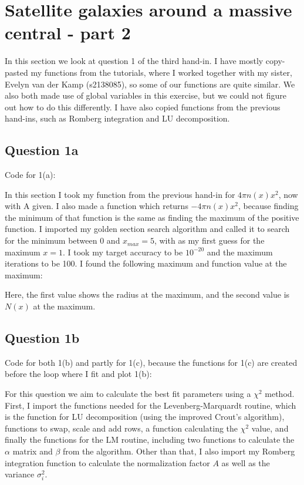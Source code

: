 \section{Satellite galaxies around a massive central - part 2}

In this section we look at question 1 of the third hand-in. 
I have mostly copy-pasted my functions from the tutorials, where I worked together with my sister,
Evelyn van der Kamp (s2138085), so some of our functions are quite similar.
We also both made use of global variables in this exercise, but we could not figure out how to do this differently.
I have also copied functions from the previous hand-ins, such as Romberg integration and LU decomposition.

\subsection{Question 1a}

Code for 1(a):


In this section I took my function from the previous hand-in for $4 \pi n(x) x^2$, now with A given.
I also made a function which returns $-4 \pi n(x) x^2$, because finding the minimum of that function is the same as finding the maximum of the positive function.
I imported my golden section search algorithm and called it to search for the minimum between 0 and $x_{max} = 5$, with as my first guess for the maximum $x=1$.
I took my target accuracy to be $10^{-20}$ and the maximum iterations to be 100.
I found the following maximum and function value at the maximum:



Here, the first value shows the radius at the maximum, and the second value is $N(x)$ at the maximum.


\subsection{Question 1b}

Code for both 1(b) and partly for 1(c), because the functions for 1(c) are created before the loop where I fit and plot 1(b):


For this question we aim to calculate the best fit parameters using a $\chi^2$ method. 
First, I import the functions needed for the Levenberg-Marquardt routine, which is the function for LU decomposition (using the improved Crout's algorithm), functions to swap, scale and add rows, a function calculating the $\chi^2$ value, and finally the functions for the LM routine, including two functions to calculate the $\alpha$ matrix and $\beta$ from the algorithm.
Other than that, I also import my Romberg integration function to calculate the normalization factor $A$ as well as the variance $\sigma_i^2$.

